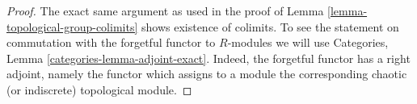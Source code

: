 \begin{proof}
The exact same argument as used in the proof of
Lemma \ref{lemma-topological-group-colimits} shows existence of colimits.
To see the statement on commutation with the forgetful functor to
$R$-modules we will use Categories, Lemma \ref{categories-lemma-adjoint-exact}.
Indeed, the forgetful functor has a right adjoint, namely the functor which
assigns to a module the corresponding chaotic (or indiscrete) topological
module.
\end{proof}











